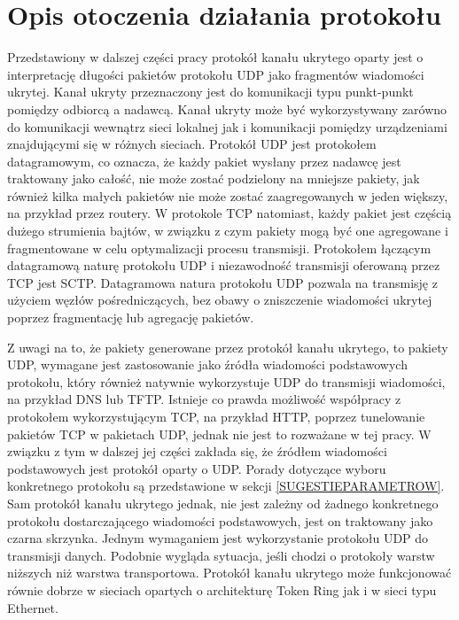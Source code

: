 \documentclass[a4paper, twoside, 12pt]{report}
\begin{document}
    \section{Opis otoczenia działania protokołu}
    Przedstawiony w dalszej części pracy protokół kanału ukrytego oparty jest o
    interpretację długości pakietów protokołu UDP jako fragmentów wiadomości ukrytej.
    Kanał ukryty przeznaczony jest do komunikacji typu punkt-punkt pomiędzy odbiorcą a nadawcą.
    Kanał ukryty może być wykorzystywany zarówno do komunikacji wewnątrz sieci lokalnej jak i
    komunikacji pomiędzy urządzeniami znajdującymi się w różnych sieciach.
    Protokół UDP jest protokołem datagramowym, co
    oznacza, że każdy pakiet wysłany przez nadawcę jest traktowany jako całość, nie może zostać
    podzielony na mniejsze pakiety, jak również kilka małych pakietów nie może zostać
    zaagregowanych w jeden większy, na przykład przez routery. W protokole TCP natomiast,
    każdy pakiet jest częścią dużego strumienia bajtów, w związku z czym pakiety mogą
    być one agregowane i fragmentowane w celu optymalizacji procesu transmisji. Protokołem
    łączącym datagramową naturę protokołu UDP i niezawodność transmisji oferowaną przez TCP jest
    SCTP\cite{SCTPRFC}. Datagramowa natura protokołu UDP pozwala na transmisję z użyciem
    węzłów pośredniczących, bez obawy o zniszczenie wiadomości ukrytej poprzez fragmentację
    lub agregację pakietów.

    Z uwagi na to, że pakiety generowane przez protokół kanału ukrytego, to pakiety UDP,
    wymagane jest
    zastosowanie jako źródła wiadomości podstawowych protokołu, który również
    natywnie wykorzystuje UDP do transmisji wiadomości, na przykład DNS lub TFTP.
    Istnieje co prawda możliwość współpracy z protokołem wykorzystującym TCP, na przykład HTTP,
    poprzez tunelowanie pakietów TCP w pakietach UDP, jednak nie jest to rozważane w tej
    pracy. W związku z tym w dalszej jej części zakłada się, że źródłem wiadomości
    podstawowych jest protokół oparty o UDP. Porady dotyczące wyboru konkretnego
    protokołu są przedstawione w sekcji \ref{SUGESTIEPARAMETROW}. Sam protokół kanału
    ukrytego jednak, nie jest zależny od żadnego konkretnego protokołu dostarczającego
    wiadomości podstawowych, jest on traktowany jako czarna skrzynka. Jednym wymaganiem
    jest wykorzystanie protokołu UDP do transmisji danych. Podobnie wygląda sytuacja,
    jeśli chodzi o protokoły warstw niższych niż warstwa transportowa. Protokół kanału
    ukrytego może funkcjonować równie dobrze w sieciach opartych o architekturę
    Token Ring jak i w sieci typu Ethernet.
\end{document}
